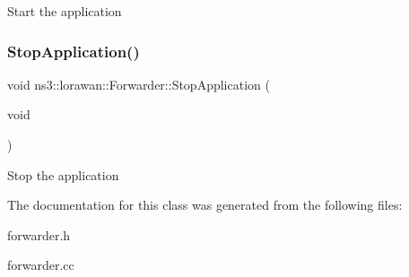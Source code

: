 Start the application \mbox{\label{classns3_1_1lorawan_1_1Forwarder_a8980a4b970c9b20e3ef27d2ab6d3d1d9}} 
\subsubsection{\texorpdfstring{Stop\+Application()}{StopApplication()}}
{\footnotesize\ttfamily void ns3\+::lorawan\+::\+Forwarder\+::\+Stop\+Application (\begin{DoxyParamCaption}\item[{void}]{ }\end{DoxyParamCaption})}

Stop the application 

The documentation for this class was generated from the following files\+:\begin{DoxyCompactItemize}
\item 
forwarder.\+h\item 
forwarder.\+cc\end{DoxyCompactItemize}

